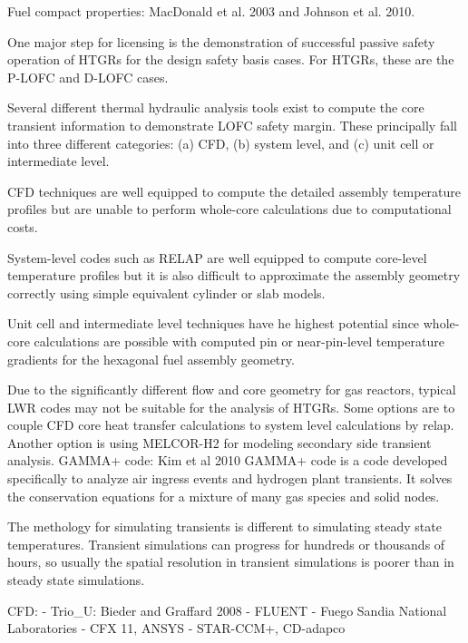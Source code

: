 Fuel compact properties: MacDonald et al. 2003 and Johnson et al. 2010.




One major step for licensing is the demonstration of successful passive safety operation of HTGRs for the design safety basis cases.
For HTGRs, these are the P-LOFC and D-LOFC cases.

Several different thermal hydraulic analysis tools exist to compute the core transient information to demonstrate LOFC safety margin.
These principally fall into three different categories: (a) CFD, (b) system level, and (c) unit cell or intermediate level.

CFD techniques are well equipped to compute the detailed assembly temperature profiles but are unable to perform whole-core calculations due to computational costs.

System-level codes such as RELAP are well equipped to compute core-level temperature profiles but it is also difficult to approximate the assembly geometry correctly using simple equivalent cylinder or slab models. 

Unit cell and intermediate level techniques have he highest potential since whole-core calculations are possible with computed pin or near-pin-level temperature gradients for the hexagonal fuel assembly geometry.


Due to the significantly different flow and core geometry for gas reactors, typical LWR codes may not be suitable for the analysis of HTGRs.
Some options are to couple CFD core heat transfer calculations to system level calculations by relap.
Another option is using MELCOR-H2 for modeling secondary side transient analysis.
GAMMA+ code:
Kim et al 2010 %
GAMMA+ code is a code developed specifically to analyze air ingress events and hydrogen plant transients.
It solves the conservation equations for a mixture of many gas species and solid nodes.

The methology for simulating transients is different to simulating steady state temperatures.
Transient simulations can progress for hundreds or thousands of hours, so usually the spatial resolution in transient simulations is poorer than in steady state simulations.

CFD:
- Trio_U: Bieder and Graffard 2008 %
- FLUENT
- Fuego Sandia National Laboratories
- CFX 11, ANSYS
- STAR-CCM+, CD-adapco

